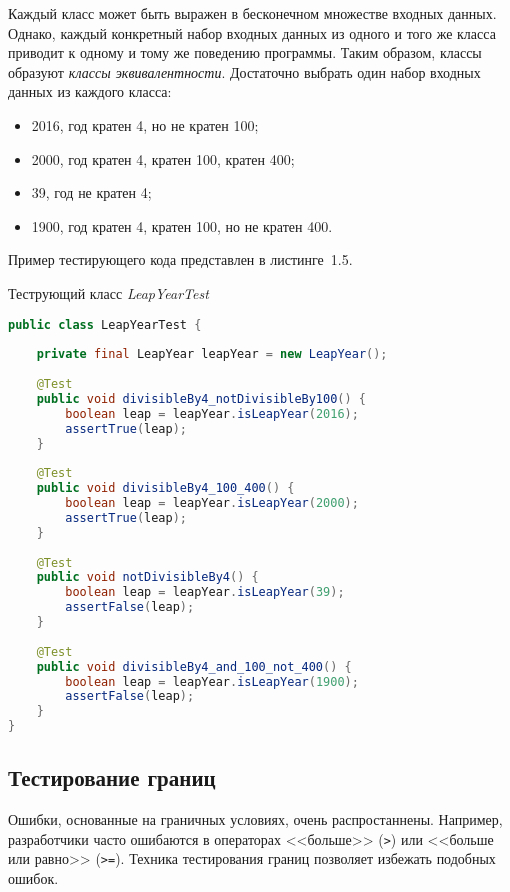 Каждый класс может быть выражен в бесконечном множестве входных данных. Однако, каждый конкретный набор входных данных из одного и того же класса приводит к одному и тому же поведению программы. Таким образом, классы образуют \textit{классы эквивалентности}. Достаточно выбрать один набор входных данных из каждого класса:

 \begin{itemize}
	\item 2016, год кратен 4, но не кратен 100;
	\item 2000, год кратен 4, кратен 100, кратен 400;
	\item 39, год не кратен 4;
	\item 1900, год кратен 4, кратен 100, но не кратен 400.
\end{itemize}

Пример тестирующего кода представлен в листинге~1.5.

\begin{ListingEnv}[!h]%
	\captiondelim{ } %
	\caption{Теструющий класс \textit{LeapYearTest}}
	\begin{lstlisting}[language={Java}]
public class LeapYearTest {
	
	private final LeapYear leapYear = new LeapYear();
	
	@Test
	public void divisibleBy4_notDivisibleBy100() {
		boolean leap = leapYear.isLeapYear(2016);
		assertTrue(leap);
	}
	
	@Test
	public void divisibleBy4_100_400() {
		boolean leap = leapYear.isLeapYear(2000);
		assertTrue(leap);
	}
	
	@Test
	public void notDivisibleBy4() {
		boolean leap = leapYear.isLeapYear(39);
		assertFalse(leap);
	}
	
	@Test
	public void divisibleBy4_and_100_not_400() {
		boolean leap = leapYear.isLeapYear(1900);
		assertFalse(leap);
	}
}
	\end{lstlisting}
\end{ListingEnv}%



\subsection{Тестирование границ} 
 
Ошибки, основанные на граничных условиях, очень распростаннены. Например, разработчики часто ошибаются в операторах <<больше>> (\texttt{>}) или <<больше или равно>> (\texttt{>=}). Техника тестирования границ позволяет избежать подобных ошибок.

